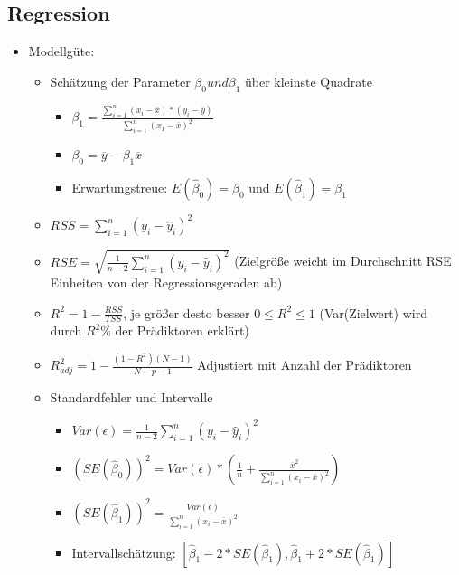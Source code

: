 \documentclass[a4paper]{article}
\begin{document}
\begin{landscape}
\begin{multicols}{3}
        \section{Regression}
        \begin{itemize}[noitemsep,nolistsep,leftmargin=*]
            \item Modellgüte:
            \begin{itemize}[noitemsep,nolistsep,leftmargin=*]
                \item Schätzung der Parameter $\beta_0 und \beta_1$ über kleinste Quadrate
                \begin{itemize}[noitemsep,nolistsep,leftmargin=*]
                    \item $\beta_1 = \frac{\sum_{i=1}^{n}(x_i-\overline{x})*(y_i-\overline{y})}{\sum_{i=1}^{n}(x_1-\overline{x})^2}$ 
                    \item $\beta_0 = \overline{y} - \beta_1\overline{x}$
                    \item Erwartungstreue: $E(\hat{\beta}_0) = \beta_0$ und $E(\hat{\beta}_1) = \beta_1$
                \end{itemize}
                \item $RSS = \sum_{i=1}^{n}(y_i-\hat{y}_i)^2$
                \item $RSE = \sqrt{\frac{1}{n-2}\sum_{i=1}^{n}(y_i-\hat{y}_i)^2}$ (Zielgröße weicht im Durchschnitt RSE Einheiten von der Regressionsgeraden ab)
                \item $R^2 = 1 - \frac{RSS}{TSS}$, je größer desto besser $0 \leq R^2 \leq 1$ (Var(Zielwert) wird durch $R^2\%$ der Prädiktoren erklärt)
                \item $R^2_{adj} = 1- \frac{(1-R^2)(N-1)}{N-p-1}$ Adjustiert mit Anzahl der Prädiktoren
                \item Standardfehler und Intervalle
                \begin{itemize}[noitemsep,nolistsep,leftmargin=*]
                    \item $Var(\epsilon)=\frac{1}{n-2}\sum_{i=1}^{n}(y_i-\hat{y}_i)^2$
                    \item $(SE(\hat{\beta}_0))^2 = Var(\epsilon)*(\frac{1}{n}+\frac{\overline{x}^2}{\sum_{i=1}^{n}(x_i-\overline{x})^2})$
                    \item $(SE(\hat{\beta}_1))^2 = \frac{Var(\epsilon)}{\sum_{i=1}^{n}(x_i-\overline{x})^2}$
                    \item Intervallschätzung: $[\hat{\beta}_1-2*SE(\hat{\beta}_1), \hat{\beta}_1+2*SE(\hat{\beta}_1)]$

\end{itemize}
\end{itemize}
\end{itemize}
\end{multicols}
\end{landscape}
\end{document}
